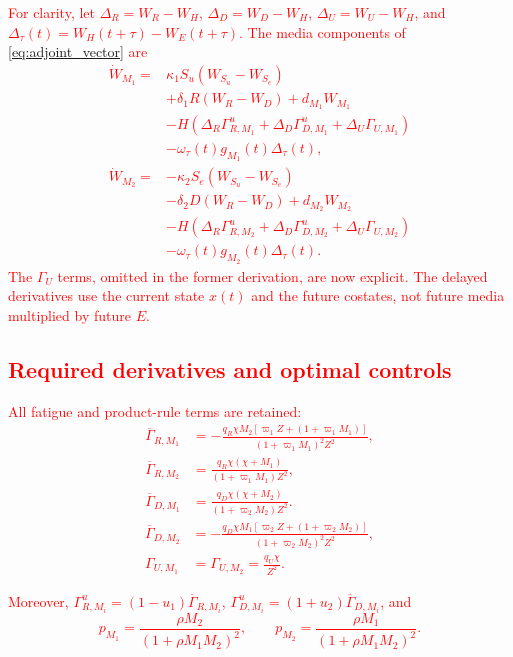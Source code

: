 \documentclass[letterpaper,journal]{IEEEtran}
\begin{document}
	\enlargethispage{1\baselineskip}
	\textcolor{red}{
	For clarity, let $\Delta_R=W_R-W_H$, $\Delta_D=W_D-W_H$,
	$\Delta_U=W_U-W_H$, and
	$\Delta_\tau(t)=W_H(t+\tau)-W_E(t+\tau)$. The media components of
	\eqref{eq:adjoint_vector} are}
	\textcolor{red}{
	\begin{align}
	\dot W_{M_1}={}&\kappa_1S_u(W_{S_u}-W_{S_e})\nonumber\\
	&+\delta_1R(W_R-W_D)+d_{M_1}W_{M_1}\nonumber\\
	&-H\!\left(\Delta_R\Gamma^u_{R,M_1}
	 +\Delta_D\Gamma^u_{D,M_1}
	 +\Delta_U\Gamma_{U,M_1}\right)\nonumber\\
	&-\omega_\tau(t)g_{M_1}(t)\Delta_\tau(t),
	\label{eq:adjoint_m1}\\
	\dot W_{M_2}={}&-\kappa_2S_e(W_{S_u}-W_{S_e})\nonumber\\
	&-\delta_2D(W_R-W_D)+d_{M_2}W_{M_2}\nonumber\\
	&-H\!\left(\Delta_R\Gamma^u_{R,M_2}
	 +\Delta_D\Gamma^u_{D,M_2}
	 +\Delta_U\Gamma_{U,M_2}\right)\nonumber\\
	&-\omega_\tau(t)g_{M_2}(t)\Delta_\tau(t).
	\label{eq:adjoint_m2}
	\end{align}
	}
	\textcolor{red}{The $\Gamma_U$ terms, omitted in the former derivation, are now explicit. The delayed derivatives use the current state $x(t)$ and the future costates, not future media multiplied by future $E$.}

	\subsection{\textcolor{red}{Required derivatives and optimal controls}}
	\textcolor{red}{All fatigue and product-rule terms are retained:}
	\textcolor{red}{
	\begin{align*}
	\overline\Gamma_{R,M_1}&=-\frac{q_R\chi M_2[\varpi_1Z+(1+\varpi_1M_1)]}{(1+\varpi_1M_1)^2Z^2},\\
	\overline\Gamma_{R,M_2}&=\frac{q_R\chi(\chi+M_1)}{(1+\varpi_1M_1)Z^2},\\
	\overline\Gamma_{D,M_1}&=\frac{q_D\chi(\chi+M_2)}{(1+\varpi_2M_2)Z^2}.
	\end{align*}
	\begin{align*}
	\overline\Gamma_{D,M_2}&=-\frac{q_D\chi M_1[\varpi_2Z+(1+\varpi_2M_2)]}{(1+\varpi_2M_2)^2Z^2},\\
	\Gamma_{U,M_1}&=\Gamma_{U,M_2}=\frac{q_U\chi}{Z^2}.
	\end{align*}
	}

	\textcolor{red}{Moreover, $\Gamma^u_{R,M_i}=(1-u_1)\overline\Gamma_{R,M_i}$,
	$\Gamma^u_{D,M_i}=(1+u_2)\overline\Gamma_{D,M_i}$, and}
	\textcolor{red}{
	\begin{equation*}
	p_{M_1}=\frac{\rho M_2}{(1+\rho M_1M_2)^2},\qquad
	p_{M_2}=\frac{\rho M_1}{(1+\rho M_1M_2)^2}.
	\end{equation*}
	}
	
\end{document}
